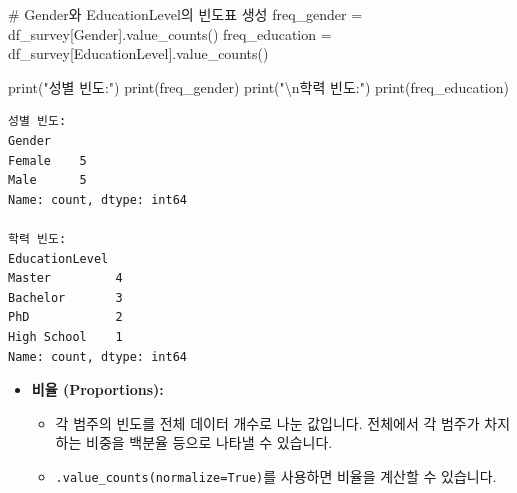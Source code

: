 \documentclass[
  letterpaper,
]{book}
\newenvironment{Shaded}{\begin{snugshade}}{\end{snugshade}}
\newcommand{\BuiltInTok}[1]{\textcolor[rgb]{0.00,0.23,0.31}{#1}}
\newcommand{\CharTok}[1]{\textcolor[rgb]{0.13,0.47,0.30}{#1}}
\newcommand{\CommentTok}[1]{\textcolor[rgb]{0.37,0.37,0.37}{#1}}
\newcommand{\NormalTok}[1]{\textcolor[rgb]{0.00,0.23,0.31}{#1}}
\newcommand{\OperatorTok}[1]{\textcolor[rgb]{0.37,0.37,0.37}{#1}}
\newcommand{\StringTok}[1]{\textcolor[rgb]{0.13,0.47,0.30}{#1}}
\providecommand{\tightlist}{%
  \setlength{\itemsep}{0pt}\setlength{\parskip}{0pt}}
\begin{document}
\begin{Shaded}
\begin{Highlighting}[]
    \CommentTok{\# Gender와 EducationLevel의 빈도표 생성}
\NormalTok{    freq\_gender }\OperatorTok{=}\NormalTok{ df\_survey[}\StringTok{\textquotesingle{}Gender\textquotesingle{}}\NormalTok{].value\_counts()}
\NormalTok{    freq\_education }\OperatorTok{=}\NormalTok{ df\_survey[}\StringTok{\textquotesingle{}EducationLevel\textquotesingle{}}\NormalTok{].value\_counts()}

    \BuiltInTok{print}\NormalTok{(}\StringTok{"성별 빈도:"}\NormalTok{)}
    \BuiltInTok{print}\NormalTok{(freq\_gender)}
    \BuiltInTok{print}\NormalTok{(}\StringTok{"}\CharTok{\textbackslash{}n}\StringTok{학력 빈도:"}\NormalTok{)}
    \BuiltInTok{print}\NormalTok{(freq\_education)}
\end{Highlighting}
\end{Shaded}

\begin{verbatim}
성별 빈도:
Gender
Female    5
Male      5
Name: count, dtype: int64

학력 빈도:
EducationLevel
Master         4
Bachelor       3
PhD            2
High School    1
Name: count, dtype: int64
\end{verbatim}

\begin{itemize}
\tightlist
\item
  \textbf{비율 (Proportions):}

  \begin{itemize}
  \tightlist
  \item
    각 범주의 빈도를 전체 데이터 개수로 나눈 값입니다. 전체에서 각
    범주가 차지하는 비중을 백분율 등으로 나타낼 수 있습니다.
  \item
    \texttt{.value\_counts(normalize=True)}를 사용하면 비율을 계산할 수
    있습니다.
  \end{itemize}
\end{itemize}
\end{document}
